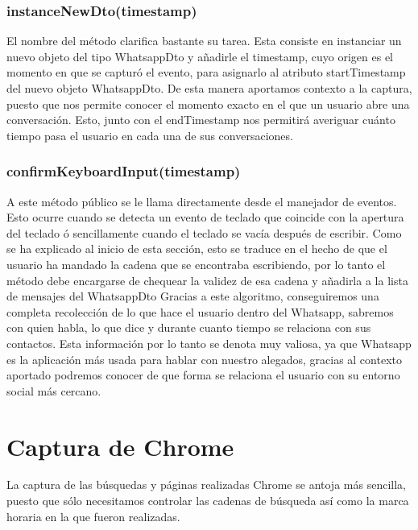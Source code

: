 \documentclass[12pt,a4paper,oneside]{book} %
\begin{document}
\subsubsection{instanceNewDto(timestamp)}
El nombre del método clarifica bastante su tarea. Esta consiste en instanciar un nuevo objeto del tipo WhatsappDto y añadirle el timestamp, cuyo origen es el momento en que se capturó el evento, para asignarlo al atributo startTimestamp del nuevo objeto WhatsappDto. 
\newline \newline 
De esta manera aportamos contexto a la captura, puesto que nos permite conocer el momento exacto en el que un usuario abre una conversación. Esto, junto con el endTimestamp nos permitirá averiguar cuánto tiempo pasa el usuario en cada una de sus conversaciones. 
\subsubsection{confirmKeyboardInput(timestamp)}
A este método público se le llama directamente desde el manejador de eventos. Esto ocurre cuando se detecta un evento de teclado que coincide con la apertura del teclado ó sencillamente cuando el teclado se vacía después de escribir. 
\newline \newline 
Como se ha explicado al inicio de esta sección, esto se traduce en el hecho de que el usuario ha mandado la cadena que se encontraba escribiendo, por lo tanto el método debe encargarse de chequear la validez de esa cadena y añadirla a la lista de mensajes del WhatsappDto
\newline \newline 
Gracias a este algoritmo, conseguiremos una completa recolección de lo que hace el usuario dentro del Whatsapp, sabremos con quien habla, lo que dice y durante cuanto tiempo se relaciona con sus contactos. Esta información por lo tanto se denota muy valiosa, ya que Whatsapp es la aplicación más usada para hablar con nuestro alegados, gracias al contexto aportado podremos conocer de que forma se relaciona el usuario con su entorno social más cercano. 
\section{Captura de Chrome}
La captura de las búsquedas y páginas realizadas Chrome se antoja más sencilla, puesto que sólo necesitamos controlar las cadenas de búsqueda así como la marca horaria en la que fueron realizadas. 
\end{document}
